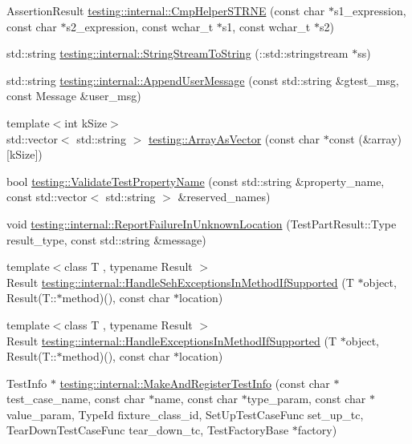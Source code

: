 \begin{DoxyCompactItemize}
\item 
Assertion\-Result \hyperlink{namespacetesting_1_1internal_a415a953647bbc9469f062dc966061efb}{testing\-::internal\-::\-Cmp\-Helper\-S\-T\-R\-N\-E} (const char $\ast$s1\-\_\-expression, const char $\ast$s2\-\_\-expression, const wchar\-\_\-t $\ast$s1, const wchar\-\_\-t $\ast$s2)
\item 
std\-::string \hyperlink{namespacetesting_1_1internal_a1c063cdfa8269116167e71b477266381}{testing\-::internal\-::\-String\-Stream\-To\-String} (\-::std\-::stringstream $\ast$ss)
\item 
std\-::string \hyperlink{namespacetesting_1_1internal_ae475a090bca903bb222dd389eb189166}{testing\-::internal\-::\-Append\-User\-Message} (const std\-::string \&gtest\-\_\-msg, const Message \&user\-\_\-msg)
\item 
{\footnotesize template$<$int k\-Size$>$ }\\std\-::vector$<$ std\-::string $>$ \hyperlink{namespacetesting_ab25cc403881367e4ae289dab4eb37f5d}{testing\-::\-Array\-As\-Vector} (const char $\ast$const (\&array)\mbox{[}k\-Size\mbox{]})
\item 
bool \hyperlink{namespacetesting_a4c9bd414747bf0563bfdb32a2307dcdf}{testing\-::\-Validate\-Test\-Property\-Name} (const std\-::string \&property\-\_\-name, const std\-::vector$<$ std\-::string $>$ \&reserved\-\_\-names)
\item 
void \hyperlink{namespacetesting_1_1internal_a85f6ff0e40f9a5f10af66a73cf1364fa}{testing\-::internal\-::\-Report\-Failure\-In\-Unknown\-Location} (Test\-Part\-Result\-::\-Type result\-\_\-type, const std\-::string \&message)
\item 
{\footnotesize template$<$class T , typename Result $>$ }\\Result \hyperlink{namespacetesting_1_1internal_ac5293b438139ef7ed05cb7fcaaf63545}{testing\-::internal\-::\-Handle\-Seh\-Exceptions\-In\-Method\-If\-Supported} (T $\ast$object, Result(T\-::$\ast$method)(), const char $\ast$location)
\item 
{\footnotesize template$<$class T , typename Result $>$ }\\Result \hyperlink{namespacetesting_1_1internal_addb2ed165b92b74e25fe9ebe9e46b9f9}{testing\-::internal\-::\-Handle\-Exceptions\-In\-Method\-If\-Supported} (T $\ast$object, Result(T\-::$\ast$method)(), const char $\ast$location)
\item 
Test\-Info $\ast$ \hyperlink{namespacetesting_1_1internal_a8280dfb4f7c8d5b71184f91f4725f759}{testing\-::internal\-::\-Make\-And\-Register\-Test\-Info} (const char $\ast$test\-\_\-case\-\_\-name, const char $\ast$name, const char $\ast$type\-\_\-param, const char $\ast$value\-\_\-param, Type\-Id fixture\-\_\-class\-\_\-id, Set\-Up\-Test\-Case\-Func set\-\_\-up\-\_\-tc, Tear\-Down\-Test\-Case\-Func tear\-\_\-down\-\_\-tc, Test\-Factory\-Base $\ast$factory)

\end{DoxyCompactItemize}
